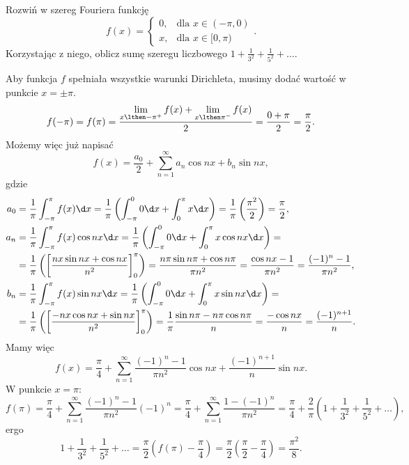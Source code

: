 \begin{example}
    Rozwiń w szereg Fouriera funkcję
    \[ f(x) = \begin{cases}
        0, & \text{dla } x \in (-\pi, 0) \\
        x, & \text{dla } x \in [0, \pi)
    \end{cases}. \]
    Korzystając z niego, oblicz sumę szeregu liczbowego $1 + \frac{1}{3^2} + \frac{1}{5^2} + \ldots$.
\end{example}
\begin{solution}
    Aby funkcja $f$ spełniała wszystkie warunki Dirichleta, musimy dodać wartość w punkcie $x = \pm \pi$.
    \[ f(-\pi) = f(\pi) = \frac{\lim\limits_{x\lthen -\pi^+}f(x) + \lim\limits_{x\lthen \pi^-}f(x)}{2} = \frac{0 + \pi}{2} = \frac{\pi}{2}. \]
    Możemy więc już napisać
    \[ f(x) = \frac{a_0}{2} + \sum_{n=1}^\infty a_n\cos nx + b_n\sin nx, \]
    gdzie
    \begin{align*}
        a_0 &= \frac{1}{\pi}\int_{-\pi}^\pi f(x) \d x = \frac{1}{\pi}\left(\int_{-\pi}^0 0 \d x + \int_0^\pi x \d x\right) = \frac{1}{\pi}\left(\frac{\pi^2}{2}\right) = \frac{\pi}{2}, \\
        a_n &= \frac{1}{\pi}\int_{-\pi}^\pi f(x)\cos{nx} \d x = \frac{1}{\pi}\left(\int_{-\pi}^0 0 \d x + \int_0^\pi x \cos{nx} \d x\right) = \\
            &= \frac{1}{\pi}\left(\left[\frac{nx\sin{nx} + \cos{nx}}{n^2}\right]_0^\pi\right) = \frac{n\pi\sin{n\pi} + \cos{n\pi}}{\pi n^2} = \frac{\cos{nx} - 1}{\pi n^2} = \frac{(-1)^n - 1}{\pi n^2}, \\
        b_n &= \frac{1}{\pi}\int_{-\pi}^\pi f(x)\sin{nx} \d x = \frac{1}{\pi}\left(\int_{-\pi}^0 0 \d x + \int_0^\pi x \sin{nx} \d x\right) = \\
            &= \frac{1}{\pi}\left(\left[\frac{-nx\cos{nx} + \sin{nx}}{n^2}\right]_0^\pi\right) = \frac{1}{\pi}\frac{\sin{n\pi} - n\pi\cos{n\pi}}{n} = \frac{-\cos{nx}}{n} = \frac{(-1)^{n+1}}{n}.
    \end{align*}
    Mamy więc
    \[ f(x) = \frac{\pi}{4} + \sum_{n=1}^\infty \frac{(-1)^n - 1}{\pi n^2}\cos{nx} + \frac{(-1)^{n+1}}{n}\sin{nx}. \]
    W punkcie $x = \pi$:
    \[ f(\pi) = \frac{\pi}{4} + \sum_{n=1}^\infty \frac{(-1)^n - 1}{\pi n^2}(-1)^n = \frac{\pi}{4} + \sum_{n=1}^\infty \frac{1 - (-1)^n}{\pi n^2} = \frac{\pi}{4} + \frac{2}{\pi}\left(1 + \frac{1}{3^2} + \frac{1}{5^2} + \ldots\right), \]
    ergo
    \[ 1 + \frac{1}{3^2} + \frac{1}{5^2} + \ldots = \frac{\pi}{2}\left(f(\pi) - \frac{\pi}{4}\right) = \frac{\pi}{2}\left(\frac{\pi}{2} - \frac{\pi}{4}\right) = \frac{\pi^2}{8}. \]
\end{solution}

